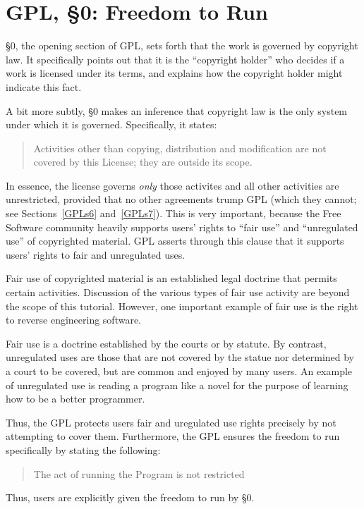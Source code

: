 \documentclass[12pt]{report}
\begin{document}
\section{GPL, \S 0: Freedom to Run}

\S 0, the opening section of GPL, sets forth that the work is governed by
copyright law.  It specifically points out that it is the ``copyright
holder'' who decides if a work is licensed under its terms, and explains
how the copyright holder might indicate this fact.

A bit more subtly, \S 0 makes an inference that copyright law is the only
system under which it is governed.  Specifically, it states:
\begin{quote}
Activities other than copying, distribution and modification are not
covered by this License; they are outside its scope.
\end{quote}
In essence, the license governs \emph{only} those activites and all other
activities are unrestricted, provided that no other agreements trump GPL
(which they cannot; see Sections~\ref{GPLs6} and~\ref{GPLs7}).  This is
very important, because the Free Software community heavily supports
users' rights to ``fair use'' and ``unregulated use'' of copyrighted
material.  GPL asserts through this clause that it supports users' rights
to fair and unregulated uses.

Fair use of copyrighted material is an established legal doctrine that
permits certain activities.  Discussion of the various types of fair use
activity are beyond the scope of this tutorial.  However, one important
example of fair use is the right to reverse engineering software.

Fair use is a doctrine established by the courts or by statute.  By
contrast, unregulated uses are those that are not covered by the statue
nor determined by a court to be covered, but are common and enjoyed by
many users.  An example of unregulated use is reading a program like a
novel for the purpose of learning how to be a better programmer.

\medskip

Thus, the GPL protects users fair and uregulated use rights precisely by
not attempting to cover them.  Furthermore, the GPL ensures the freedom
to run specifically by stating the following:
\begin{quote}
The act of running the Program is not restricted
\end{quote}
Thus, users are explicitly given the freedom to run by \S 0.
\end{document}
